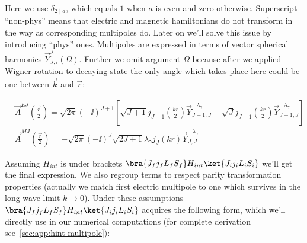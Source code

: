 Here we use $\delta_{2 \mid a}$, which equals $1$ when $a$ is even and zero otherwise. Superscript ``non-phys'' means that electric and magnetic hamiltonians do not transform in the way as corresponding multipoles do. Later on we'll solve this issue by introducing ``phys'' ones. Multipoles are expressed in terms of vector spherical harmonics $\vec{Y}^\lambda_{J, l}(\Omega)$. Further we omit argument $\Omega$ because after we applied Wigner rotation to decaying state the only angle which takes place here could be one between $\vec{k}$ and $\vec{r}$:

\begin{align}
    &\vec{A}^{EJ}(\frac{\vec{r}}{2}) = \sqrt{2\pi} (-\ii)^{J+1} \left[ \sqrt{J+1} j_{J-1}(\frac{kr}{2}) \vec{Y}^{-\lambda_\gamma}_{J-1, J} - \sqrt{J} j_{J+1}(\frac{kr}{2}) \vec{Y}^{-\lambda_\gamma}_{J+1, J} \right] \\
    &\vec{A}^{MJ}(\frac{\vec{r}}{2}) = -\sqrt{2\pi} (-\ii)^J \sqrt{2J+1} \lambda_\gamma j_J(k r) \vec{Y}^{-\lambda_\gamma}_{J,J}
\end{align}

Assuming $H_{int}$ is under brackets $\bra{J_f j_f L_f S_f} H_{int} \ket{J_i j_i L_i S_i}$ we'll get the final expression. We also regroup terms to respect parity transformation properties (actually we match first electric multipole to one which survives in the long-wave limit $k \rightarrow 0$). Under these assumptions $\bra{J_f j_f L_f S_f} H_{int} \ket{J_i j_i L_i S_i}$ acquires the following form, which we'll directly use in our numerical computations (for complete derivation see~\cref{sec:app:hint-multipole}):

